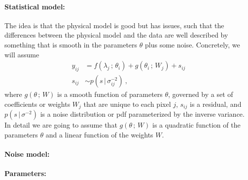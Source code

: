 \documentclass{article}
\newcommand{\semicolon}{\,;\,}
\newcommand{\given}{\,|\,}
\begin{document}
\paragraph{Statistical model:}
The idea is that the physical model is good but has issues, such that the differences between the physical model and the data are well described by something that is smooth in the parameters $\theta$ plus some noise.
Concretely, we will assume
\begin{align}
    y_{ij} &= f(\lambda_j\semicolon\theta_i) + g(\theta_i\semicolon W_j) + s_{ij} \\
    s_{ij} &\sim p(s\given\sigma^{-2}_{ij}) ~,
\end{align}
where $g(\theta\semicolon W)$ is a smooth function of parameters $\theta$, governed by a set of coefficients or weights $W_{j}$ that are unique to each pixel $j$,
$s_{ij}$ is a residual,
and $p(s\given\sigma^{-2})$ is a noise distribution or pdf parameterized by the inverse variance.
In detail we are going to assume that $g(\theta\semicolon W)$ is a quadratic function of the parameters $\theta$ and a linear function of the weights $W$.

\paragraph{Noise model:}

\paragraph{Parameters:}
\end{document}
